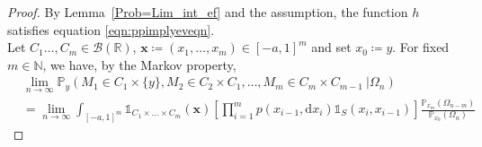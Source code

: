 \documentclass[12pt]{article}
\newcommand{\N}{\mathbb{N}} %
\newcommand{\R}{\mathbb{R}} %
\renewcommand{\P}{\mathbb{P}} %
\newcommand{\1}{\mathds{1}}
\renewcommand{\d}{\mathrm{d}}
\theoremstyle{definition}
\theoremstyle{plain}
\theoremstyle{remark}
\begin{document}
\begin{proof}
By Lemma~\ref{Prob=Lim_int_ef} and the assumption, the function $h$ satisfies equation \eqref{eqn:ppimplyeveqn}. 
    \\Let $C_1\dots , C_m\in\mathcal{B}(\R)$, $\mathbf{x}\coloneqq(x_1,\dots,x_m)\in [-a,1]^m$ and set $x_0\coloneqq y$. For fixed $m\in\N$, we have, by the Markov property,
\begin{align*}
    &\lim_{n\to\infty}\P_{y}(M_1\in C_1\times\{y\},M_2\in C_2\times C_1,\dots,M_m\in C_m\times C_{m-1}~|\Omega_n)
    \\
    &=\lim_{n\to\infty}\int_{[-a,1]^m}\1_{C_1\times\dots\times C_m}(\mathbf{x})\left[\prod_{i=1}^m p(x_{i-1},\d x_i)\mathds{1}_S(x_i,x_{i-1})\right]\frac{\P_{x_m}(\Omega_{n-m})}{\P_{x_0}(\Omega_n)} %

\end{align*}
\end{proof}
\end{document}
